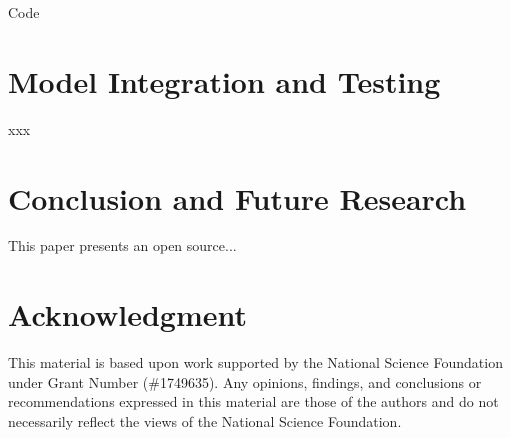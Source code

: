 \documentclass[conference]{IEEEtran}
\begin{document}





Code

\section{Model Integration and Testing}\label{sec:Integration}
xxx

\section{Conclusion and Future Research}\label{sec:Concl}
This paper presents an open source...

\section*{Acknowledgment}
This material is based upon work supported by the National Science Foundation under Grant Number (\#1749635). Any opinions, findings, and conclusions or recommendations expressed in this material are those of the authors and do not necessarily reflect the views of the National Science Foundation.



\end{document}
